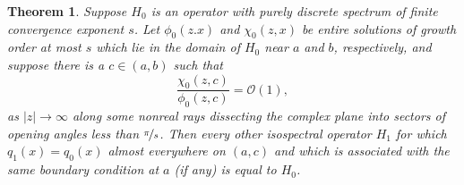 \documentclass{amsart}
\newtheorem{theorem}{Theorem}[section]
\numberwithin{equation}{section}
\begin{document}
\begin{theorem}\label{thmHL}
Suppose $H_0$ is an operator with purely discrete spectrum of finite convergence exponent $s$. Let $\phi_0(z.x)$ and $\chi_0(z,x)$ be
entire solutions of growth order at most $s$ which lie in the domain of $H_0$ near $a$ and $b$, respectively, and suppose there is a $c\in (a,b)$ such that
\begin{equation}\label{eqeahl}
\frac{\chi_0(z,c)}{\phi_0(z,c)}={\mathcal{O}}(1),
\end{equation}
as $|z|\rightarrow\infty$ along some nonreal rays dissecting the complex plane into sectors of opening angles less than $\nicefrac{\pi}{s}$.
 Then every other isospectral operator $H_1$ for which $q_1(x)=q_0(x)$ almost everywhere on $(a,c)$ and which is associated with the same boundary
condition at $a$ (if any) is equal to $H_0$.
\end{theorem}
\end{document}
